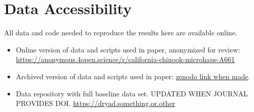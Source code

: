 \section*{Data Accessibility}

All data and code needed to reproduce the results here are available online.
\begin{itemize}
\item Online version of data and scripts used in paper, anonymized for review: \\
          \url{https://anonymous.4open.science/r/california-chinook-microhaps-A661}
\item Archived version of data and scripts used in paper: \url{zenodo link when made}.
\item Data repository with full baseline data set. UPDATED WHEN JOURNAL PROVIDES DOI. \url{https://dryad.something.or.other}
\end{itemize}
\mbox{}

